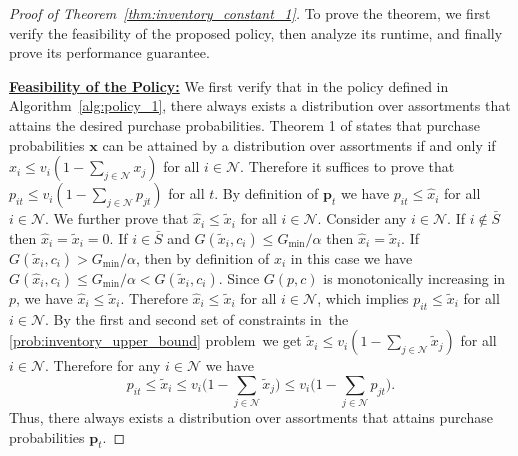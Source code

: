 \documentclass[mnsc,non-blindrev]{informs3}
\theoremstyle{definition}
\begin{document}
\begin{proof}[Proof of Theorem~\ref{thm:inventory_constant_1}]
To prove the theorem, we first verify the feasibility of the proposed policy, then analyze its runtime, and finally prove its performance guarantee. 

\noindent\underline{\bf Feasibility of the Policy:} 
We first verify that in the policy defined in Algorithm~\ref{alg:policy_1}, there always exists a distribution over assortments that attains the desired purchase probabilities. Theorem 1 of \cite{topaloglu2013joint} states that purchase probabilities $\bm{x}$ can be attained by a distribution over assortments if and only if $x_i\leq v_i(1-\sum_{j\in\mathcal{N}}x_j)$ for all $i\in\mathcal{N}$. Therefore it suffices to prove that $p_{it}\leq v_i(1-\sum_{j\in\mathcal{N}}p_{jt})$ for all $t$. By definition of $\bm{p}_t$ we have $p_{it}\leq \hat{x}_i$ for all $i\in\mathcal{N}$. We further prove that $\hat{x}_i\leq \tilde{x}_i$ for all $i\in\mathcal{N}$. Consider any $i\in\mathcal{N}$. If $i\notin \bar{S}$ then $\hat{x}_i=\tilde{x}_i=0$. If $i\in \bar{S}$ and $G(\tilde{x}_i,c_i)\leq G_{\min}/\alpha$ then $\hat{x}_i=\tilde{x}_i$. If $G(\tilde{x}_i,c_i)>G_{\min}/\alpha$, then by definition of $\hat{x}_i$ in this case we have $G(\hat{x}_i,c_i)\leq G_{\min}/\alpha<G(\tilde{x}_i,c_i)$. Since $G(p,c)$ is monotonically increasing in $p$, we have $\hat{x}_i\leq \tilde{x}_i$. Therefore $\hat{x}_i\leq \tilde{x}_i$ for all $i\in\mathcal{N}$, which implies $p_{it}\leq \tilde{x}_i$ for all $i\in\mathcal{N}$. By the first and second set of constraints in~the \ref{prob:inventory_upper_bound} problem~we get $\tilde{x}_i\leq v_i(1-\sum_{j\in\mathcal{N}}\tilde{x}_j)$ for all $i\in\mathcal{N}$. Therefore for any $i\in\mathcal{N}$ we have
\begin{equation*}
p_{it}\leq \tilde{x}_i\leq v_i\Big(1-\sum_{j\in\mathcal{N}}\tilde{x}_j\Big)\leq v_i\Big(1-\sum_{j\in\mathcal{N}}p_{jt}\Big).
\end{equation*}
Thus, there always exists a distribution over assortments that attains purchase probabilities $\bm{p}_t$.


\end{proof}
\end{document}
